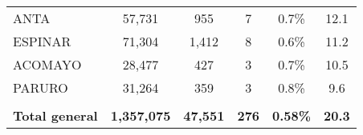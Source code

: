 \begin{tabular}{lccccc}
	\cellcolor[HTML]{FFFF99}ANTA                                    & 57,731               & 955                                  & 7                    & 0.7\%                      & 12.1                                        \\
	\cellcolor[HTML]{FFFF99}ESPINAR                                 & 71,304               & 1,412                                & 8                    & 0.6\%                      & 11.2                                        \\
	\cellcolor[HTML]{FFFF99}ACOMAYO                                 & 28,477               & 427                                  & 3                    & 0.7\%                      & 10.5                                        \\
	\cellcolor[HTML]{FFFF99}PARURO                                  & 31,264               & 359                                  & 3                    & 0.8\%                      & 9.6                                         \\
	& \multicolumn{1}{l}{} & \multicolumn{1}{l}{}                 & \multicolumn{1}{l}{} & \multicolumn{1}{l}{}       & \multicolumn{1}{l}{}                        \\
	\rowcolor[HTML]{DDEBF7} 
	\textbf{Total general}                                          & \textbf{1,357,075}   & \textbf{47,551}                      & \textbf{276}         & \textbf{0.58\%}            & \textbf{20.3}                              
\end{tabular}